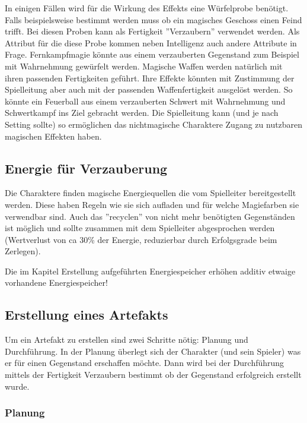 \documentclass{article}
\begin{document}
In einigen Fällen wird für die Wirkung des Effekts eine Würfelprobe benötigt. Falls beispielsweise bestimmt werden
muss ob ein magisches Geschoss einen Feind trifft. Bei diesen Proben kann als Fertigkeit ''Verzaubern'' verwendet werden.
Als Attribut für die diese Probe kommen neben Intelligenz auch andere Attribute in Frage. Fernkampfmagie könnte aus
einem verzauberten Gegenstand zum Beispiel mit Wahrnehmung gewürfelt werden.
Magische Waffen werden natürlich mit ihren passenden Fertigkeiten geführt. Ihre Effekte könnten mit Zustimmung der
Spielleitung aber auch mit der passenden Waffenfertigkeit ausgelöst werden. So könnte ein Feuerball aus einem
verzauberten Schwert mit Wahrnehmung und Schwertkampf ins Ziel gebracht werden. Die Spielleitung kann (und je nach
Setting sollte) so ermöglichen das nichtmagische Charaktere Zugang zu nutzbaren magischen Effekten haben.

\begin{center}
\subsection{Energie für Verzauberung}
\end{center}

Die Charaktere finden magische Energiequellen die vom Spielleiter bereitgestellt werden. Diese haben Regeln wie sie
sich aufladen und für welche Magiefarben sie verwendbar sind. Auch das ''recyclen'' von nicht mehr benötigten
Gegenständen ist möglich und sollte zusammen mit dem Spielleiter abgesprochen werden (Wertverlust von ca 30\% der
Energie, reduzierbar durch Erfolgsgrade beim Zerlegen).

Die im Kapitel Erstellung aufgeführten Energiespeicher erhöhen additiv etwaige vorhandene Energiespeicher!

\begin{center}
\subsection{Erstellung eines Artefakts}
\end{center}

Um ein Artefakt zu erstellen sind zwei Schritte nötig: Planung und Durchführung. In der Planung überlegt sich der
Charakter (und sein Spieler) was er für einen Gegenstand erschaffen möchte. Dann wird bei der Durchführung mittels
der Fertigkeit Verzaubern bestimmt ob der Gegenstand erfolgreich erstellt wurde.

\subsubsection{Planung}
\end{document}
